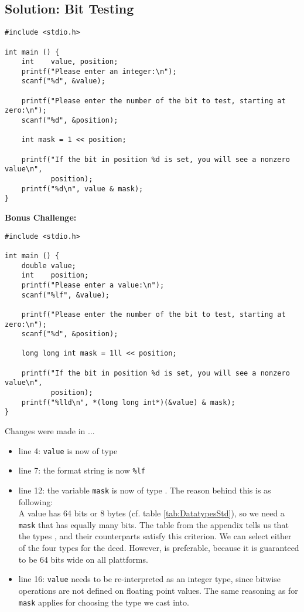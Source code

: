 {\subsection*{Solution: Bit Testing}
\begin{codebox}[exo4-3.c]
\begin{verbatim}
#include <stdio.h>

int main () {
    int    value, position;
    printf("Please enter an integer:\n");
    scanf("%d", &value);
    
    printf("Please enter the number of the bit to test, starting at zero:\n");
    scanf("%d", &position);
    
    int mask = 1 << position;
    
    printf("If the bit in position %d is set, you will see a nonzero value\n",
           position);
    printf("%d\n", value & mask);
}
\end{verbatim}
\end{codebox}

\newpage
\textbf{Bonus Challenge:}
\begin{codebox}
\begin{verbatim}
#include <stdio.h>

int main () {
    double value;
    int    position;
    printf("Please enter a value:\n");
    scanf("%lf", &value);

    printf("Please enter the number of the bit to test, starting at zero:\n");
    scanf("%d", &position);

    long long int mask = 1ll << position;

    printf("If the bit in position %d is set, you will see a nonzero value\n",
           position);
    printf("%lld\n", *(long long int*)(&value) & mask);
}
\end{verbatim}
\end{codebox}

Changes were made in ...
\begin{itemize}
\item line 4: \texttt{value} is now of type 
\item line 7: the format string is now \texttt{\%lf}
\item line 12: the variable \texttt{mask} is now of type . The reason behind this is as following:\\
	A  value has 64 bits or 8 bytes (cf. table \ref{tab:DatatypesStd}), so we need a \texttt{mask} that has equally many bits.
	The table from the appendix tells us that the types ,  and their  counterparts satisfy this criterion.
	We can select either of the four types for the deed. However,  is preferable, because it is guaranteed to be 64 bits wide on all plattforms.
\item line 16: \texttt{value} needs to be re-interpreted as an integer type, since bitwise operations are not defined on floating point values.
	The same reasoning as for \texttt{mask} applies for choosing the type we cast into.\\
\end{itemize}

}
